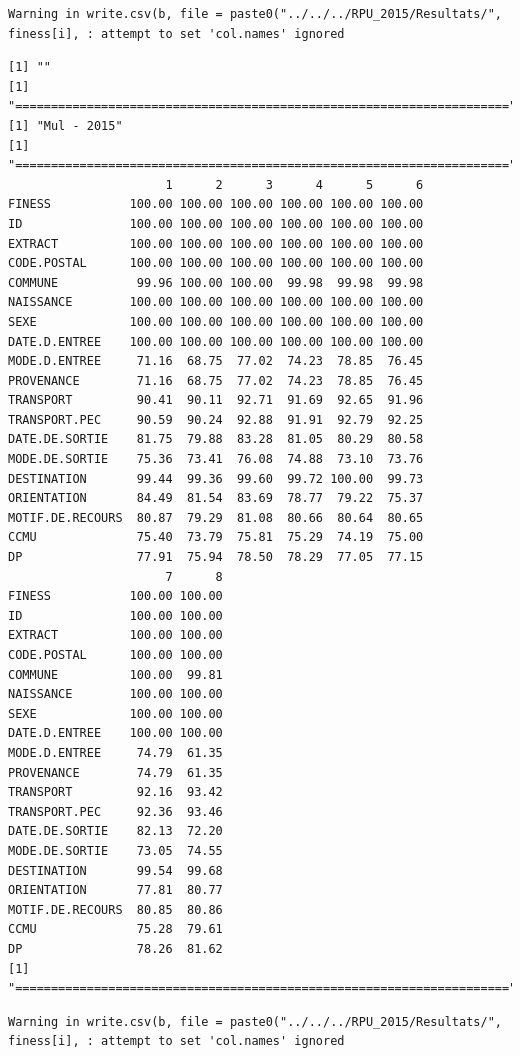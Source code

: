 \documentclass[]{article}
\begin{document}
\begin{verbatim}
Warning in write.csv(b, file = paste0("../../../RPU_2015/Resultats/",
finess[i], : attempt to set 'col.names' ignored
\end{verbatim}

\begin{verbatim}
[1] ""
[1] "====================================================================="
[1] "Mul - 2015"
[1] "====================================================================="
                      1      2      3      4      5      6
FINESS           100.00 100.00 100.00 100.00 100.00 100.00
ID               100.00 100.00 100.00 100.00 100.00 100.00
EXTRACT          100.00 100.00 100.00 100.00 100.00 100.00
CODE.POSTAL      100.00 100.00 100.00 100.00 100.00 100.00
COMMUNE           99.96 100.00 100.00  99.98  99.98  99.98
NAISSANCE        100.00 100.00 100.00 100.00 100.00 100.00
SEXE             100.00 100.00 100.00 100.00 100.00 100.00
DATE.D.ENTREE    100.00 100.00 100.00 100.00 100.00 100.00
MODE.D.ENTREE     71.16  68.75  77.02  74.23  78.85  76.45
PROVENANCE        71.16  68.75  77.02  74.23  78.85  76.45
TRANSPORT         90.41  90.11  92.71  91.69  92.65  91.96
TRANSPORT.PEC     90.59  90.24  92.88  91.91  92.79  92.25
DATE.DE.SORTIE    81.75  79.88  83.28  81.05  80.29  80.58
MODE.DE.SORTIE    75.36  73.41  76.08  74.88  73.10  73.76
DESTINATION       99.44  99.36  99.60  99.72 100.00  99.73
ORIENTATION       84.49  81.54  83.69  78.77  79.22  75.37
MOTIF.DE.RECOURS  80.87  79.29  81.08  80.66  80.64  80.65
CCMU              75.40  73.79  75.81  75.29  74.19  75.00
DP                77.91  75.94  78.50  78.29  77.05  77.15
                      7      8
FINESS           100.00 100.00
ID               100.00 100.00
EXTRACT          100.00 100.00
CODE.POSTAL      100.00 100.00
COMMUNE          100.00  99.81
NAISSANCE        100.00 100.00
SEXE             100.00 100.00
DATE.D.ENTREE    100.00 100.00
MODE.D.ENTREE     74.79  61.35
PROVENANCE        74.79  61.35
TRANSPORT         92.16  93.42
TRANSPORT.PEC     92.36  93.46
DATE.DE.SORTIE    82.13  72.20
MODE.DE.SORTIE    73.05  74.55
DESTINATION       99.54  99.68
ORIENTATION       77.81  80.77
MOTIF.DE.RECOURS  80.85  80.86
CCMU              75.28  79.61
DP                78.26  81.62
[1] "====================================================================="
\end{verbatim}

\begin{verbatim}
Warning in write.csv(b, file = paste0("../../../RPU_2015/Resultats/",
finess[i], : attempt to set 'col.names' ignored
\end{verbatim}
\end{document}
